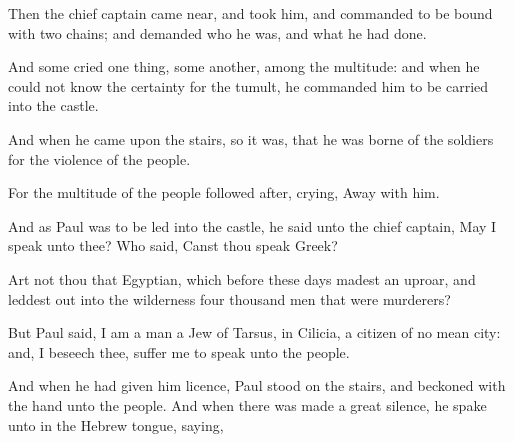 {Then the chief
captain came
near, and
took
him,
and
commanded
{} to be
bound with
two
chains;
and
demanded
who he
was,
and
what he
had
done.

And
some
cried one
thing, some
another,
among the
multitude:
and when he
could
not
know the
certainty
for the
tumult, he
commanded
him to be
carried
into the
castle.

And
when
he
came
upon the
stairs, so it
was, that he was
borne
of the
soldiers
for the
violence of the
people.

For the
multitude of the
people followed
after,
crying, Away
with
him.

And as
Paul
was to be
led
into the
castle, he
said unto the chief
captain,
May
I
speak
unto
thee?
Who
said, Canst thou
speak
Greek?

Art
not
thou
that
Egyptian,
which
before
these
days madest an
uproar,
and leddest
out
into the
wilderness four
thousand
men that were
murderers?

But
Paul
said,
I
am a
man
{} a
Jew of
Tarsus,
{} in
Cilicia, a
citizen
of
no
mean
city:
and, I
beseech
thee,
suffer
me to
speak
unto the
people.

And when he had
given
him
licence,
Paul
stood
on the
stairs, and
beckoned with the
hand unto the
people.
And when there was
made a
great
silence, he spake
unto
{} in the
Hebrew
tongue,
saying,




\par }
